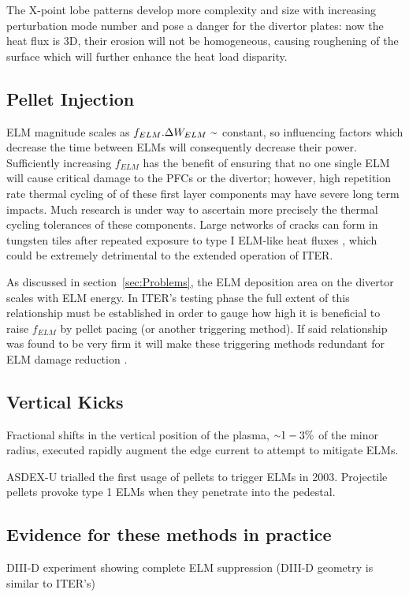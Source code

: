 \documentclass[12pt]{article}  %
\providecommand{\squiggle}{\raise.17ex\hbox{$\scriptstyle\sim$}} %
\begin{document}
The X-point lobe patterns develop more complexity and size with increasing perturbation mode number \cite{Harrison2014} and pose a danger for the divertor plates: now the heat flux is 3D, their erosion will not be homogeneous, causing roughening of the surface which will further enhance the heat load disparity.

\subsection{Pellet Injection}\label{ssec:PInjection}
ELM magnitude scales as $f_{ELM}.\Delta W_{ELM}~\squiggle$ constant\cite{Loarte2002,Leonard1999,KirkFF}, so influencing factors which decrease the time between ELMs will consequently decrease their power. Sufficiently increasing $f_{ELM}$ has the benefit of ensuring that no one single ELM will cause critical damage to the PFCs or the divertor; however, high repetition rate thermal cycling of of these first layer components may have severe long term impacts. Much research is under way to ascertain more precisely the thermal cycling tolerances of these components. Large networks of cracks can form in tungsten tiles after repeated exposure to type I ELM-like heat fluxes \cite{Linke2011}, which could be extremely detrimental to the extended operation of ITER.

As discussed in section~\ref{sec:Problems}, the ELM deposition area on the divertor scales with ELM energy. In ITER's testing phase the full extent of this relationship must be established in order to gauge how high it is beneficial to raise $f_{ELM}$ by pellet pacing (or another triggering method). If said relationship was found to be very firm it will make these triggering methods redundant for ELM damage reduction \cite{Lang2013}.



\subsection{Vertical Kicks}\label{ssec:Vkicks}
Fractional shifts in the vertical position of the plasma, $\squiggle 1-3\%$ of the minor radius\cite{KirkFF}, executed rapidly augment the edge current to attempt to mitigate ELMs.\cite{DelaLuna2016}

ASDEX-U trialled the first usage of pellets to trigger ELMs in 2003.\cite{Lang2003} Projectile pellets provoke type 1 ELMs when they penetrate into the pedestal.\cite{KirkFF}

\subsection{Evidence for these methods in practice}\label{ssec:EIP}
DIII-D experiment showing complete ELM suppression (DIII-D geometry is similar to ITER's)\cite{Mordijck2011}
\end{document}
